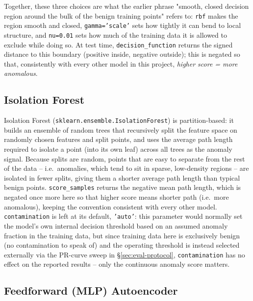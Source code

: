Together, these three choices are what the earlier phrase "smooth, closed decision region around the bulk of the benign training points" refers to: \texttt{rbf} makes the region smooth and closed, \texttt{gamma='scale'} sets how tightly it can bend to local structure, and \texttt{nu=0.01} sets how much of the training data it is allowed to exclude while doing so. At test time, \texttt{decision\_function} returns the signed distance to this boundary (positive inside, negative outside); this is negated so that, consistently with every other model in this project, \emph{higher score = more anomalous}.

\subsection{Isolation Forest}

Isolation Forest (\texttt{sklearn.ensemble.IsolationForest}) is partition-based: it builds an ensemble of random trees that recursively split the feature space on randomly chosen features and split points, and uses the average path length required to isolate a point (into its own leaf) across all trees as the anomaly signal. Because splits are random, points that are easy to separate from the rest of the data -- i.e.\ anomalies, which tend to sit in sparse, low-density regions -- are isolated in fewer splits, giving them a shorter average path length than typical benign points. \texttt{score\_samples} returns the negative mean path length, which is negated once more here so that higher score means shorter path (i.e.\ more anomalous), keeping the convention consistent with every other model. \texttt{contamination} is left at its default, \texttt{'auto'}: this parameter would normally set the model's own internal decision threshold based on an assumed anomaly fraction in the training data, but since training data here is exclusively benign (no contamination to speak of) and the operating threshold is instead selected externally via the PR-curve sweep in \S\ref{sec:eval-protocol}, \texttt{contamination} has no effect on the reported results -- only the continuous anomaly score matters.

\subsection{Feedforward (MLP) Autoencoder}

